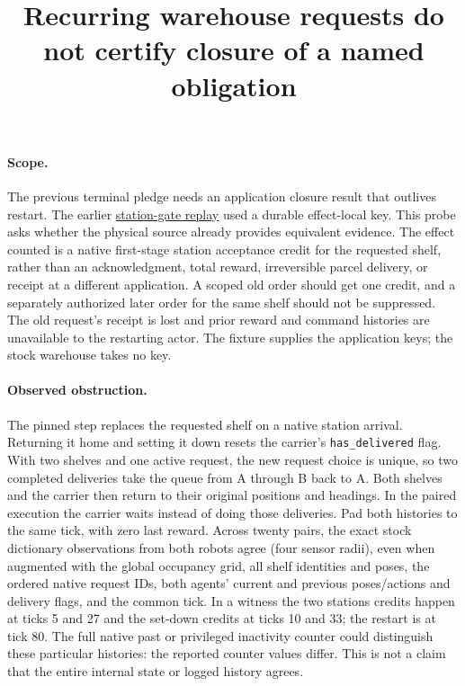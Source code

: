 \documentclass{article}
\title{Recurring warehouse requests do not certify closure of a named obligation}
\begin{document}
\maketitle

\paragraph{Scope.}
The previous terminal pledge needs an application closure result that
outlives restart. The earlier
\href{https://github.com/eternal-november/eos-research-programmes/pull/606}{station-gate replay}
used a durable effect-local key. This probe asks whether the physical source
already provides equivalent evidence. The effect counted is a native
first-stage station acceptance credit for the requested shelf, rather
than an acknowledgment, total reward, irreversible parcel delivery, or
receipt at a different application. A scoped old order should get one
credit, and a separately authorized later order for the same shelf should
not be suppressed. The old request's receipt is lost and prior reward
and command histories are unavailable to the restarting actor. The
fixture supplies the application keys; the stock warehouse takes no key.

\paragraph{Observed obstruction.}
The pinned step replaces the requested shelf on a native station arrival.
Returning it home and setting it down resets the carrier's
\texttt{has\_delivered} flag. With two shelves and one active request, the
new request choice is unique, so two completed deliveries take the queue
from A through B back to A. Both shelves and the carrier then return to
their original positions and headings. In the paired execution the
carrier waits instead of doing those deliveries. Pad both histories to
the same tick, with zero last reward. Across twenty pairs, the exact
stock dictionary observations from both robots agree (four sensor
radii), even when augmented with the global occupancy grid, all shelf
identities and poses, the ordered native request IDs, both agents'
current and previous poses/actions and delivery flags, and the common
tick. In a witness the two stations credits happen at ticks 5 and 27
and the set-down credits at ticks 10 and 33; the restart is at tick 80.
The full native past or privileged inactivity counter could distinguish
these particular histories: the reported counter values differ. This is
not a claim that the entire internal state or logged history agrees.
\end{document}
